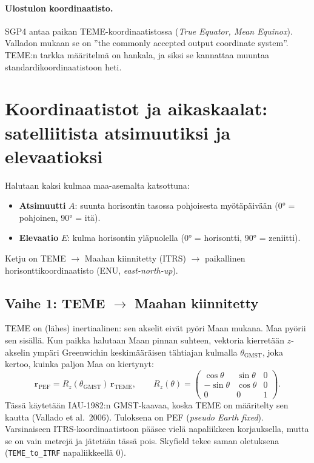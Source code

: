 \documentclass[a4paper,11pt]{article}
\newcommand{\koodi}[1]{\texttt{#1}}
\begin{document}
\paragraph{Ulostulon koordinaatisto.} SGP4 antaa paikan TEME-koordinaatistossa (\emph{True Equator, Mean Equinox}). Valladon mukaan se on ”the commonly accepted output coordinate system”. TEME:n tarkka määritelmä on hankala, ja siksi se kannattaa muuntaa standardikoordinaatistoon heti.

\section{Koordinaatistot ja aikaskaalat: satelliitista atsimuutiksi ja elevaatioksi}\label{sec:koord}

Halutaan kaksi kulmaa maa-asemalta katsottuna:
\begin{itemize}
  \item \textbf{Atsimuutti} $A$: suunta horisontin tasossa pohjoisesta myötäpäivään (0° = pohjoinen, 90° = itä).
  \item \textbf{Elevaatio} $E$: kulma horisontin yläpuolella (0° = horisontti, 90° = zeniitti).
\end{itemize}
Ketju on TEME $\to$ Maahan kiinnitetty (ITRS) $\to$ paikallinen horisonttikoordinaatisto (ENU, \emph{east-north-up}).

\subsection{\texorpdfstring{Vaihe 1: TEME $\to$ Maahan kiinnitetty}{Vaihe 1: TEME → Maahan kiinnitetty}}

TEME on (lähes) inertiaalinen: sen akselit eivät pyöri Maan mukana. Maa pyörii sen sisällä. Kun paikka halutaan Maan pinnan suhteen, vektoria kierretään $z$-akselin ympäri Greenwichin keskimääräisen tähtiajan kulmalla $\theta_\text{GMST}$, joka kertoo, kuinka paljon Maa on kiertynyt:
\[
\mathbf r_\text{PEF} = R_z(\theta_\text{GMST})\,\mathbf r_\text{TEME},\qquad
R_z(\theta) = \begin{pmatrix}\cos\theta & \sin\theta & 0\\ -\sin\theta & \cos\theta & 0\\ 0&0&1\end{pmatrix}.
\]
Tässä käytetään IAU-1982:n GMST-kaavaa, koska TEME on määritelty sen kautta (Vallado et al.\ 2006). Tuloksena on PEF (\emph{pseudo Earth fixed}). Varsinaiseen ITRS-koordinaatistoon pääsee vielä napaliikkeen korjauksella, mutta se on vain metrejä ja jätetään tässä pois. Skyfield tekee saman oletuksena (\koodi{TEME\_to\_ITRF} napaliikkeellä 0).
\end{document}

